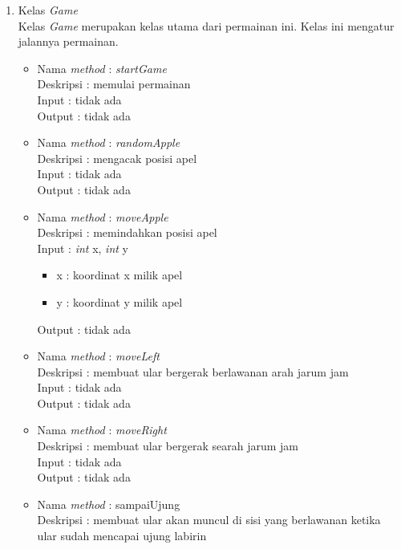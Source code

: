 \begin{enumerate}
	\item Kelas \textit{Game} \\
	Kelas \textit{Game} merupakan kelas utama dari permainan ini. Kelas ini mengatur jalannya permainan.
		
		\begin{itemize}
			\item Nama \textit{method} : \textit{startGame}\\
				  Deskripsi : memulai permainan\\
				  Input : tidak ada\\
				  Output : tidak ada\\
			\item Nama \textit{method} : \textit{randomApple}\\
				  Deskripsi : mengacak posisi apel\\
				  Input : tidak ada\\
				  Output : tidak ada\\
			\item Nama \textit{method} : \textit{moveApple}\\
				  Deskripsi : memindahkan posisi apel\\
				  Input : \textit{int} x, \textit{int} y
				  	\begin{itemize}
				  		\item x : koordinat x milik apel
				  		\item y : koordinat y milik apel
				  	\end{itemize}
				  Output : tidak ada\\
			\item Nama \textit{method} : \textit{moveLeft}\\
				  Deskripsi : membuat ular bergerak berlawanan arah jarum jam\\
				  Input : tidak ada\\
				  Output : tidak ada\\
			\item Nama \textit{method} : \textit{moveRight}\\
				  Deskripsi : membuat ular bergerak searah jarum jam\\
				  Input : tidak ada\\
				  Output : tidak ada\\
			\item Nama \textit{method} : sampaiUjung\\
				  Deskripsi : membuat ular akan muncul di sisi yang berlawanan ketika ular sudah mencapai ujung labirin\\

\end{itemize}
\end{enumerate}
